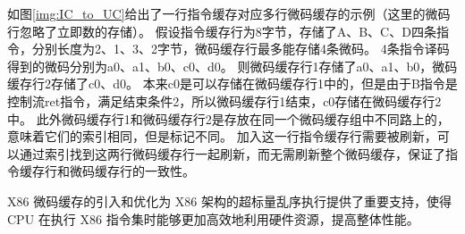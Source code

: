 如图\ref{img:IC_to_UC}给出了一行指令缓存对应多行微码缓存的示例（这里的微码行忽略了立即数的存储）。
假设指令缓存行为8字节，存储了A、B、C、D四条指令，分别长度为2、1、3、2字节，微码缓存行最多能存储4条微码。
4条指令译码得到的微码分别为a0、a1、b0、c0、d0。
则微码缓存行1存储了a0、a1、b0，微码缓存行2存储了c0、d0。
本来c0是可以存储在微码缓存行1中的，但是由于B指令是控制流ret指令，满足结束条件2，所以微码缓存行1结束，c0存储在微码缓存行2中。
此外微码缓存行1和微码缓存行2是存放在同一个微码缓存组中不同路上的，意味着它们的索引相同，但是标记不同。
加入这一行指令缓存行需要被刷新，可以通过索引找到这两行微码缓存行一起刷新，而无需刷新整个微码缓存，保证了指令缓存行和微码缓存行的一致性。

X86 微码缓存的引入和优化为 X86 架构的超标量乱序执行提供了重要支持，使得 CPU 在执行 X86 指令集时能够更加高效地利用硬件资源，提高整体性能。









